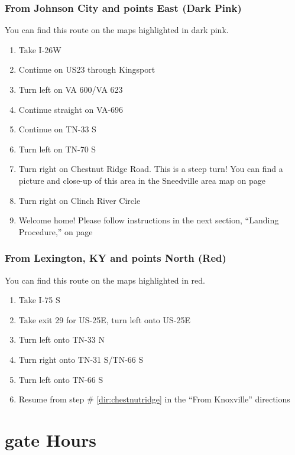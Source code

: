 \subsubsection*{From Johnson City and points East (Dark Pink)}
You can find this route on the maps highlighted in dark pink.

\begin{enumerate}[noitemsep]
	\item Take I-26W
    \item Continue on US23 through Kingsport
    \item Turn left on VA 600/VA 623
    \item Continue straight on VA-696
    \item Continue on TN-33 S
    \item Turn left on TN-70 S
    \item Turn right on Chestnut Ridge Road. This is a steep turn! You can find a picture and close-up of this area in the Sneedville area map on page \pageref{image:sneedville}
    \item Turn right on Clinch River Circle
    \item Welcome home!  Please follow instructions in the next section, ``Landing Procedure,'' on page \pageref{sec:parking}
\end{enumerate}


\subsubsection*{From Lexington, KY and points North (Red)}
You can find this route on the maps highlighted in red.

\begin{enumerate}[noitemsep]
	\item Take I-75 S
    \item Take exit 29 for US-25E, turn left onto US-25E
    \item Turn left onto TN-33 N
    \item Turn right onto TN-31 S/TN-66 S
    \item Turn left onto TN-66 S
    \item Resume from step \# \ref{dir:chestnutridge} in the ``From Knoxville'' directions
\end{enumerate}

\section*{\Gls{gate} Hours}
\label{sec:gate}

